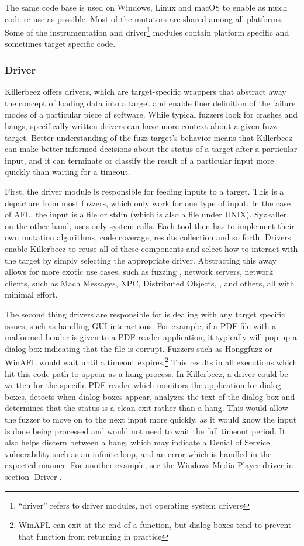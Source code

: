 The same code base is used on Windows, Linux and macOS to enable as much code
re-use as possible.  Most of the mutators are shared among all platforms.
Some of the instrumentation and driver\footnote{
``driver'' refers to driver modules, not operating system drivers}
modules contain platform specific and sometimes target specific code.

\subsubsection{Driver} \label{Driver Overview}
Killerbeez offers drivers, which are target-specific wrappers that abstract
away the concept of loading data into a target and enable finer
definition of the failure modes of a particular piece of software. While
typical fuzzers look for crashes and hangs, specifically-written drivers can
have more context about a given fuzz target.  Better understanding of the fuzz
target's behavior means that Killerbeez can make better-informed decisions
about the status of a target after a particular input, and it can terminate or
classify the result of a particular input more quickly than waiting for a
timeout.

First, the driver module is responsible for feeding inputs to a target.  This
is a departure from most fuzzers, which only work for one type of input.  In
the case of AFL, the input is a file or stdin (which is also a file under
UNIX).  Syzkaller\cite{syzkaller}, on the other hand, uses only system calls.
Each tool then has to implement their own mutation algorithms, code coverage,
results collection and so forth. Drivers enable Killerbeez to reuse all of
these components and select how to interact with the target by simply selecting
the appropriate driver.  Abstracting this away allows for more exotic use
cases, such as fuzzing \IOCTLs{}, network servers, network clients, \IPC{} such as
Mach Messages, XPC, Distributed Objects, \COM{}, and others, all with minimal
effort.

The second thing drivers are responsible for is dealing with any target
specific issues, such as handling GUI interactions.  For example, if a PDF file
with a malformed header is given to a PDF reader application, it typically will
pop up a dialog box indicating that the file is corrupt. Fuzzers such as
Honggfuzz or WinAFL would wait until a timeout expires.\footnote{WinAFL can
exit at the end of a function, but dialog boxes tend to prevent that function
from returning in practice} This results in all executions which hit this code
path to appear as a hung process.  In Killerbeez, a driver could be written for
the specific PDF reader which monitors the application for dialog boxes,
detects when dialog boxes appear, analyzes the text of the dialog box and
determines that the status is a clean exit rather than a hang.  This would allow
the fuzzer to move on to the next input more quickly, as it would know the
input is done being processed and would not need to wait the full timeout
period.  It also helps discern between a hang, which may indicate a Denial of
Service vulnerability such as an infinite loop, and an error which is handled
in the expected manner. For another example, see the Windows Media Player
driver in section \ref{Driver}.

